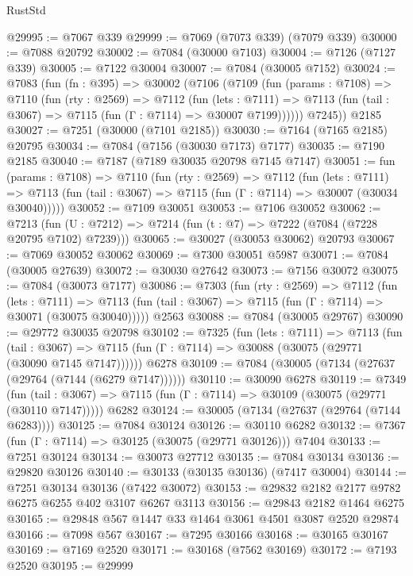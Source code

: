 \begin{lexlean}{RustStd}
\begin{coremodule}
@29995 := @7067 @339
@29999 := @7069 (@7073 @339) (@7079 @339)
@30000 := @7088 @20792
@30002 := @7084 (@30000 @7103)
@30004 := @7126 (@7127 @339)
@30005 := @7122 @30004
@30007 := @7084 (@30005 @7152)
@30024 := @7083
    (fun (fn : @395) =>
    @30002
      (@7106
        (@7109
          (fun (params : @7108) =>
          @7110
            (fun (rty : @2569) =>
            @7112
              (fun (lets : @7111) =>
              @7113 (fun (tail : @3067) => @7115 (fun (Γ : @7114) => @30007 @7199))))))
        @7245))
    @2185
@30027 := @7251 (@30000 (@7101 @2185))
@30030 := @7164 (@7165 @2185) @20795
@30034 := @7084 (@7156 (@30030 @7173) @7177)
@30035 := @7190 @2185
@30040 := @7187 (@7189 @30035 @20798 @7145 @7147)
@30051 := fun (params : @7108) =>
  @7110
    (fun (rty : @2569) =>
    @7112
      (fun (lets : @7111) =>
      @7113 (fun (tail : @3067) => @7115 (fun (Γ : @7114) => @30007 (@30034 @30040)))))
@30052 := @7109 @30051
@30053 := @7106 @30052
@30062 := @7213
    (fun (U : @7212) => @7214 (fun (t : @7) => @7222 (@7084 (@7228 @20795 @7102) @7239)))
@30065 := @30027 (@30053 @30062) @20793
@30067 := @7069 @30052 @30062
@30069 := @7300 @30051 @5987
@30071 := @7084 (@30005 @27639)
@30072 := @30030 @27642
@30073 := @7156 @30072
@30075 := @7084 (@30073 @7177)
@30086 := @7303
    (fun (rty : @2569) =>
    @7112
      (fun (lets : @7111) =>
      @7113 (fun (tail : @3067) => @7115 (fun (Γ : @7114) => @30071 (@30075 @30040)))))
    @2563
@30088 := @7084 (@30005 @29767)
@30090 := @29772 @30035 @20798
@30102 := @7325
    (fun (lets : @7111) =>
    @7113
      (fun (tail : @3067) =>
      @7115 (fun (Γ : @7114) => @30088 (@30075 (@29771 (@30090 @7145 @7147))))))
    @6278
@30109 := @7084 (@30005 (@7134 (@27637 (@29764 (@7144 (@6279 @7147))))))
@30110 := @30090 @6278
@30119 := @7349
    (fun (tail : @3067) => @7115 (fun (Γ : @7114) => @30109 (@30075 (@29771 (@30110 @7147)))))
    @6282
@30124 := @30005 (@7134 (@27637 (@29764 (@7144 @6283))))
@30125 := @7084 @30124
@30126 := @30110 @6282
@30132 := @7367 (fun (Γ : @7114) => @30125 (@30075 (@29771 @30126))) @7404
@30133 := @7251 @30124
@30134 := @30073 @27712
@30135 := @7084 @30134
@30136 := @29820 @30126
@30140 := @30133 (@30135 @30136) (@7417 @30004)
@30144 := @7251 @30134 @30136 (@7422 @30072)
@30153 := @29832 @2182 @2177 @9782 @6275 @6255 @402 @3107 @6267 @3113
@30156 := @29843 @2182 @1464 @6275
@30165 := @29848 @567 @1447 @33 @1464 @3061 @4501 @3087 @2520 @29874
@30166 := @7098 @567
@30167 := @7295 @30166
@30168 := @30165 @30167
@30169 := @7169 @2520
@30171 := @30168 (@7562 @30169)
@30172 := @7193 @2520
@30195 := @29999

\end{coremodule}
\end{lexlean}
